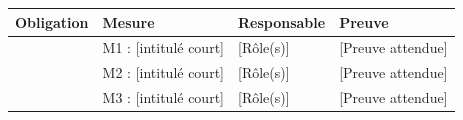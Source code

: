 \documentclass[a4paper,10pt]{article}
\begin{document}
  \begin{table}[h]
    \centering
    \small
    \begin{tabularx}{\textwidth}{@{}XXXX@{}}
      \toprule
      \textbf{Obligation} & \textbf{Mesure} & \textbf{Responsable} & \textbf{Preuve} \\
      \midrule
      [Obligation 1] & M1 : [intitulé court] & [Rôle(s)] & [Preuve attendue] \\
      [Obligation 2] & M2 : [intitulé court] & [Rôle(s)] & [Preuve attendue] \\
      [Obligation 3] & M3 : [intitulé court] & [Rôle(s)] & [Preuve attendue] \\
      \bottomrule
    \end{tabularx}
  \end{table}
\end{document}
